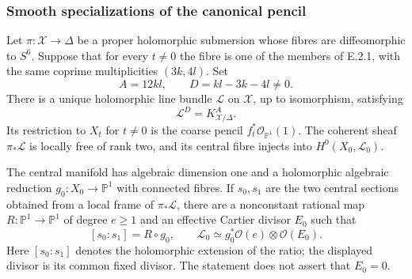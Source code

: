 \subsubsection*{Smooth specializations of the canonical pencil}

\begin{proposition}
Let $\pi:\mathcal X\to\Delta$ be a proper holomorphic submersion
whose fibres are diffeomorphic to $S^6$.  Suppose that for every
$t\ne0$ the fibre is one of the members of E.2.1, with the same
coprime multiplicities $(3k,4l)$.  Set
\[
 A=12kl,\qquad D=kl-3k-4l\ne0.
\]
There is a unique holomorphic line bundle $\mathcal L$ on
$\mathcal X$, up to isomorphism, satisfying
\[
 \mathcal L^{D}=K_{\mathcal X/\Delta}^{A}.
\]
Its restriction to $X_t$ for $t\ne0$ is the coarse pencil
$f_t^*\mathcal O_{\mathbb P^1}(1)$.  The coherent sheaf
$\pi_*\mathcal L$ is locally free of rank two, and its central
fibre injects into $H^0(X_0,\mathcal L_0)$.

The central manifold has algebraic dimension one and a
holomorphic algebraic reduction $g_0:X_0\to\mathbb P^1$ with
connected fibres.  If $s_0,s_1$ are the two central sections
obtained from a local frame of $\pi_*\mathcal L$, there are a
nonconstant rational map $R:\mathbb P^1\to\mathbb P^1$ of
degree $e\ge1$ and an effective Cartier divisor $E_0$ such that
\[
 [s_0:s_1]=R\circ g_0,\qquad
 \mathcal L_0\simeq g_0^*\mathcal O(e)\otimes\mathcal O(E_0).
\]
Here $[s_0:s_1]$ denotes the holomorphic extension of the ratio;
the displayed divisor is its common fixed divisor.  The
statement does not assert that $E_0=0$.
\end{proposition}
